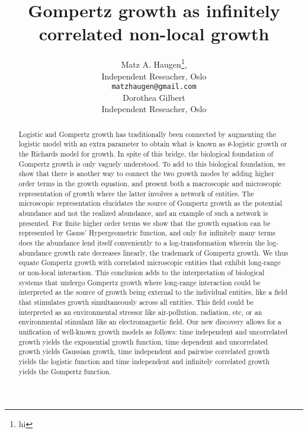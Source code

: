 \documentclass{article}
\title{Gompertz growth as infinitely correlated non-local growth}
\author{Matz A. Haugen\footnote{hi}, \\
Independent Reseacher, Oslo\\
\texttt{matzhaugen@gmail.com} \\
  \And
  Dorothea Gilbert \\
  Independent Reseacher, Oslo\\
}
\begin{document}
\maketitle

\begin{abstract}
Logistic and Gompertz growth has traditionally been connected by augmenting the logistic model with an extra parameter to obtain what is known as $\theta$-logistic growth or the Richards model for growth. In spite of this bridge, the biological foundation of Gompertz growth is only vaguely understood. 
To add to this biological foundation, we show that there is another way to connect the two growth modes by adding higher order terms in the growth equation, and present both a macroscopic and microscopic representation of growth where the latter involves a network of entities. 
The microscopic representation elucidates the source of Gompertz growth as the potential abundance and not the realized abundance, and an example of such a network is presented. 
For finite higher order terms we show that the growth equation can be represented by Gauss' Hypergeometric function, and only for infinitely many terms does the abundance lend itself conveniently to a log-transformation wherein the log-abundance growth rate decreases linearly, the trademark of Gompertz growth. We thus equate Gompertz growth with correlated microscopic entities that exhibit long-range or non-local interaction. 
This conclusion adds to the interpretation of biological systems that undergo Gompertz growth where long-range interaction could be interpreted as the source of growth being external to the individual entities, like a field that stimulates growth simultaneously across all entities. 
This field could be interpreted as an environmental stressor like air-pollution, radiation, etc, or an environmental stimulant like an electromagnetic field. 
Our new discovery allows for a unification of well-known growth models as follows: time independent and uncorrelated growth yields the exponential growth function, time dependent and uncorrelated growth yields Gaussian growth, time independent and pairwise correlated growth yields the logistic function and time independent and infinitely correlated growth yields the Gompertz function. 

\end{abstract}

\end{document}

